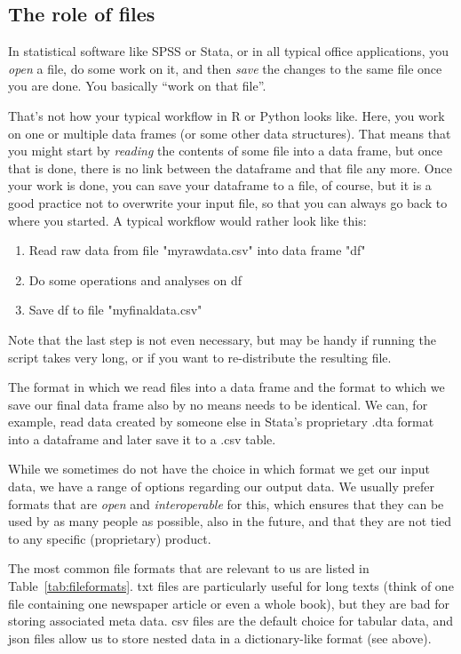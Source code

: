 \subsection{The role of files}

In statistical software like SPSS or Stata, or in all typical office applications, you \emph{open} a file, do some work on it, and then \emph{save} the changes to the same file once you are done. You basically ``work on that file''.

That's not how your typical workflow in R or Python looks like. Here, you work on one or multiple data frames (or some other data structures). That means that you might start by \emph{reading} the contents of some file into a data frame, but once that is done, there is no link between the dataframe and that file any more. Once your work is done, you can save your dataframe to a file, of course, but it is a good practice not to overwrite your input file, so that you can always go back to where you started. A typical workflow would rather look like this:
\begin{enumerate}
\item Read raw data from file "myrawdata.csv" into data frame "df"
\item Do some operations and analyses on df
\item Save df to file "myfinaldata.csv"
\end{enumerate}
Note that the last step is not even necessary, but may be handy if running the script takes very long, or if you want to re-distribute the resulting file.

The format in which we read files into a data frame and the format to which we save our final data frame also by no means needs to be identical. We can, for example, read data created by someone else in Stata's proprietary .dta format into a dataframe and later save it to a .csv table.

While we sometimes do not have the choice in which format we get our input data, we have a range of options regarding our output data. We usually prefer formats that are \emph{open} and \emph{interoperable} for this, which ensures that they can be used by as many people as possible, also in the future, and that they are not tied to any specific (proprietary) product.

The most common file formats that are relevant to us are listed in Table~\ref{tab:fileformats}. txt files are particularly useful for long texts (think of one file containing one newspaper article or even a whole book), but they are bad for storing associated meta data. csv files are the default choice for tabular data, and json files allow us to store nested data in a dictionary-like format (see above). 

